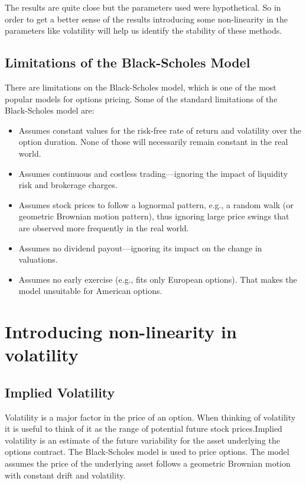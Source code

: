 \documentclass[12pt]{article}
\begin{document}
 The results are quite close but the parameters used were hypothetical. So in order to get a better sense of the results introducing some non-linearity in the parameters like volatility will help us identify the stability of these methods.
 
  \subsection{Limitations of the Black-Scholes Model}
  There are limitations on the Black-Scholes model, which is one of the most popular models for options pricing. Some of the standard limitations of the Black-Scholes model are:
 \begin{itemize}
  \item Assumes constant values for the risk-free rate of return and volatility over the option duration. None of those will necessarily remain constant in the real world.
  
  \item Assumes continuous and costless trading—ignoring the impact of liquidity risk and brokerage charges.
  
  \item Assumes stock prices to follow a lognormal pattern, e.g., a random walk (or geometric Brownian motion pattern), thus ignoring large price swings that are observed more frequently in the real world.
  
  \item Assumes no dividend payout—ignoring its impact on the change in valuations.
  
  \item Assumes no early exercise (e.g., fits only European options). That makes the model unsuitable for American options.
  \cite{seth_2022}
  \end{itemize}
  
\section{Introducing non-linearity in volatility}

 \subsection{Implied Volatility}
 Volatility is a major factor in the price of an option. When thinking of volatility it is useful to think of it as the range of potential future stock prices.Implied volatility is an estimate of the future variability for the asset underlying the options contract. The Black-Scholes model is used to price options. The model assumes the price of the underlying asset follows a geometric Brownian motion with constant drift and volatility.
 
\end{document}
